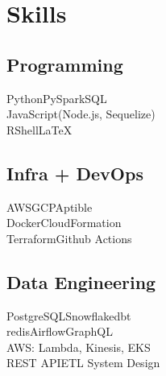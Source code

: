 \documentclass[]{snizami-resume}
\begin{document}
%
%

%
%

%
%

\begin{minipage}[t]{0.26\textwidth} 



\section{Skills}

\subsection{Programming}
Python\textbullet{}PySpark\textbullet{}SQL\textbullet{}\\
JavaScript(Node.js, Sequelize)\textbullet{}\\
R\textbullet{}Shell\textbullet{}\LaTeX
\sectionsep

\subsection{Infra + DevOps}
AWS\textbullet{}GCP\textbullet{}Aptible\textbullet{}\\
Docker\textbullet{}CloudFormation\textbullet{}\\
Terraform\textbullet{}Github Actions
\sectionsep

\subsection{Data Engineering}
PostgreSQL\textbullet{}Snowflake\textbullet{}dbt\textbullet{}\\
redis\textbullet{}Airflow\textbullet{}GraphQL\textbullet{}\\ 
AWS: Lambda, Kinesis, EKS\textbullet{}\\
REST API\textbullet{}ETL System Design
\sectionsep


\end{minipage}
\end{document}
